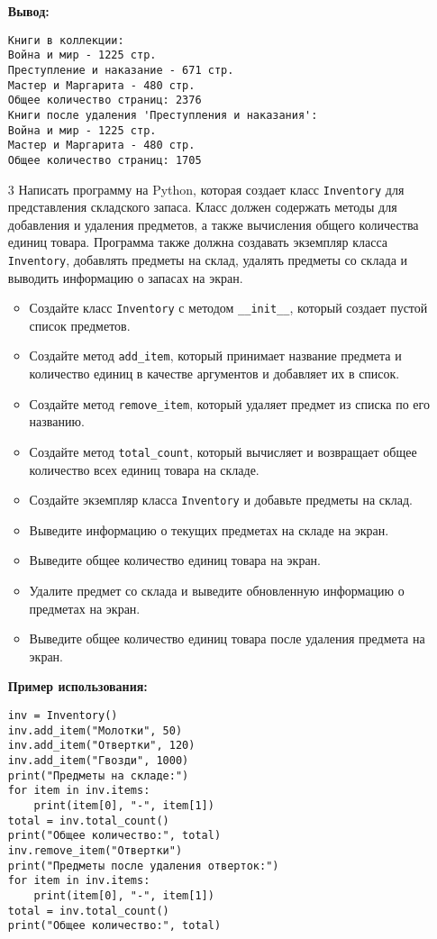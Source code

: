 \begin{enumerate}
\textbf{Вывод:}
\begin{verbatim}
Книги в коллекции:
Война и мир - 1225 стр.
Преступление и наказание - 671 стр.
Мастер и Маргарита - 480 стр.
Общее количество страниц: 2376
Книги после удаления 'Преступления и наказания':
Война и мир - 1225 стр.
Мастер и Маргарита - 480 стр.
Общее количество страниц: 1705
\end{verbatim}

\item[3] Написать программу на Python, которая создает класс \texttt{Inventory} для представления складского запаса. Класс должен содержать методы для добавления и удаления предметов, а также вычисления общего количества единиц товара. Программа также должна создавать экземпляр класса \texttt{Inventory}, добавлять предметы на склад, удалять предметы со склада и выводить информацию о запасах на экран.

\begin{itemize}
    \item Создайте класс \texttt{Inventory} с методом \texttt{\_\_init\_\_}, который создает пустой список предметов.
    \item Создайте метод \texttt{add\_item}, который принимает название предмета и количество единиц в качестве аргументов и добавляет их в список.
    \item Создайте метод \texttt{remove\_item}, который удаляет предмет из списка по его названию.
    \item Создайте метод \texttt{total\_count}, который вычисляет и возвращает общее количество всех единиц товара на складе.
    \item Создайте экземпляр класса \texttt{Inventory} и добавьте предметы на склад.
    \item Выведите информацию о текущих предметах на складе на экран.
    \item Выведите общее количество единиц товара на экран.
    \item Удалите предмет со склада и выведите обновленную информацию о предметах на экран.
    \item Выведите общее количество единиц товара после удаления предмета на экран.
\end{itemize}

\textbf{Пример использования:}

\begin{verbatim}
inv = Inventory()
inv.add_item("Молотки", 50)
inv.add_item("Отвертки", 120)
inv.add_item("Гвозди", 1000)
print("Предметы на складе:")
for item in inv.items:
    print(item[0], "-", item[1])
total = inv.total_count()
print("Общее количество:", total)
inv.remove_item("Отвертки")
print("Предметы после удаления отверток:")
for item in inv.items:
    print(item[0], "-", item[1])
total = inv.total_count()
print("Общее количество:", total)
\end{verbatim}


\end{enumerate}
